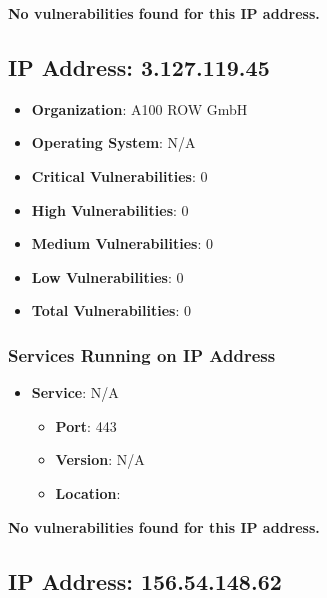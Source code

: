 \documentclass{article}
\begin{document}
\textbf{No vulnerabilities found for this IP address.}




\clearpage



\subsection*{IP Address: 3.127.119.45}

\begin{itemize}
    \item \textbf{Organization}: A100 ROW GmbH
    \item \textbf{Operating System}:  N/A 
    \item \textbf{Critical Vulnerabilities}: 0
    \item \textbf{High Vulnerabilities}: 0
    \item \textbf{Medium Vulnerabilities}: 0
    \item \textbf{Low Vulnerabilities}: 0
    \item \textbf{Total Vulnerabilities}: 0
\end{itemize}

\subsubsection*{Services Running on IP Address}

\begin{itemize}
    
        \item \textbf{Service}: N/A
        \begin{itemize}
            \item \textbf{Port}: 443
            \item \textbf{Version}:  N/A 
            \item \textbf{Location}: \href{  }{  }
        \end{itemize}
    
\end{itemize}


\textbf{No vulnerabilities found for this IP address.}




\clearpage



\subsection*{IP Address: 156.54.148.62}
\end{document}

